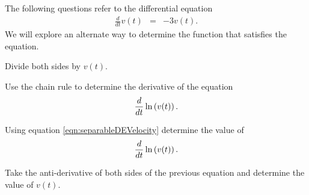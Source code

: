 \begin{problem}
\item The following questions refer to the differential equation
  \begin{eqnarray}
    \label{eqn:separableDEVelocity}
    \frac{d}{dt} v(t) & = & -3 v(t).
  \end{eqnarray}
  We will explore an alternate way to determine the function that satisfies the equation.
  \begin{subproblem}
  \item Divide both sides by $v(t)$.
    \vfill
  \item Use the chain rule to determine the derivative of the equation
    \begin{eqnarray*}
      \frac{d}{dt} \ln\left( v(t) \right).
    \end{eqnarray*}
    \vfill
  \item Using equation \ref{eqn:separableDEVelocity} determine the
    value of
    \begin{eqnarray*}
      \frac{d}{dt} \ln\left( v(t) \right).
    \end{eqnarray*}
    \vfill
  \item Take the anti-derivative of both sides of the previous
    equation and determine the value of $v(t)$.
    \vfill
  \end{subproblem}

\end{problem}

\postClass

